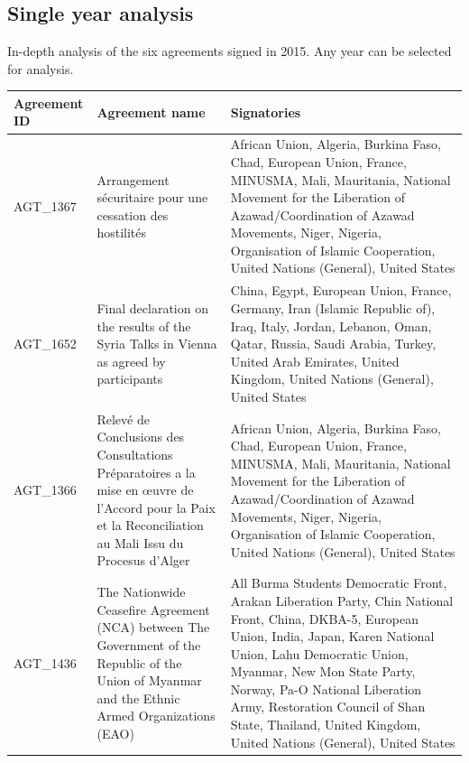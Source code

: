 \documentclass{article}
\begin{document}
\subsection{Single year analysis}

In-depth analysis of the six agreements signed in 2015. Any year can be selected for analysis.

\begin{table}[H]
\begin{center}
\small
\begin{tabularx}{\textwidth}{|l|X|X|}
    \hline
    \textbf{Agreement ID}  & \textbf{Agreement name}  & \textbf{Signatories}  \\
    \hline
AGT\_1367 & Arrangement sécuritaire pour une cessation des hostilités & African Union, Algeria, Burkina Faso, Chad, European Union, France, MINUSMA, Mali, Mauritania, National Movement for the Liberation of Azawad/Coordination of Azawad Movements, Niger, Nigeria, Organisation of Islamic Cooperation, United Nations (General), United States \\
\hline
AGT\_1652 & Final declaration on the results of the Syria Talks in Vienna as agreed by participants & China, Egypt, European Union, France, Germany, Iran (Islamic Republic of), Iraq, Italy, Jordan, Lebanon, Oman, Qatar, Russia, Saudi Arabia, Turkey, United Arab Emirates, United Kingdom, United Nations (General), United States \\
\hline
AGT\_1366 & Relevé de Conclusions des Consultations Préparatoires a la mise en œuvre de l'Accord pour la Paix et la Reconciliation au Mali Issu du Procesus d'Alger & African Union, Algeria, Burkina Faso, Chad, European Union, France, MINUSMA, Mali, Mauritania, National Movement for the Liberation of Azawad/Coordination of Azawad Movements, Niger, Nigeria, Organisation of Islamic Cooperation, United Nations (General), United States \\
\hline
AGT\_1436 & The Nationwide Ceasefire Agreement (NCA) between The Government of the Republic of the Union of Myanmar and the Ethnic Armed Organizations (EAO) & All Burma Students Democratic Front, Arakan Liberation Party, Chin National Front, China, DKBA-5, European Union, India, Japan, Karen National Union, Lahu Democratic Union, Myanmar, New Mon State Party, Norway, Pa-O National Liberation Army, Restoration Council of Shan State, Thailand, United Kingdom, United Nations (General), United States \\
\hline
\end{tabularx}
\end{center}
\normalsize
\end{table}
\end{document}
